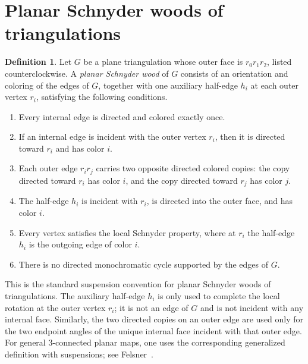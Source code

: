 \documentclass[11pt]{amsart}
\theoremstyle{plain}
\theoremstyle{definition}
\newtheorem{definition}[theorem]{Definition}
\theoremstyle{remark}
\begin{document}
\section{Planar Schnyder woods of triangulations}
\label{sec:planar}

\begin{definition}
\label{def:planar-schnyder}
Let $G$ be a plane triangulation whose outer face is $r_0 r_1 r_2$, listed counterclockwise. A \emph{planar Schnyder wood} of $G$ consists of an orientation and coloring of the edges of $G$, together with one auxiliary half-edge $h_i$ at each outer vertex $r_i$, satisfying the following conditions.
\begin{enumerate}[label=\textup{(P\arabic*)}]
  \item Every internal edge is directed and colored exactly once.
  \item If an internal edge is incident with the outer vertex $r_i$, then it is directed toward $r_i$ and has color $i$.
  \item Each outer edge $r_i r_j$ carries two opposite directed colored copies: the copy directed toward $r_i$ has color $i$, and the copy directed toward $r_j$ has color $j$.
  \item The half-edge $h_i$ is incident with $r_i$, is directed into the outer face, and has color $i$.
  \item Every vertex satisfies the local Schnyder property, where at $r_i$ the half-edge $h_i$ is the outgoing edge of color $i$.
  \item There is no directed monochromatic cycle supported by the edges of $G$.
\end{enumerate}
\end{definition}

This is the standard suspension convention for planar Schnyder woods of triangulations. The auxiliary half-edge $h_i$ is only used to complete the local rotation at the outer vertex $r_i$; it is not an edge of $G$ and is not incident with any internal face. Similarly, the two directed copies on an outer edge are used only for the two endpoint angles of the unique internal face incident with that outer edge. For general $3$-connected planar maps, one uses the corresponding generalized definition with suspensions; see Felsner~\cite{felsner2001,felsner2004}.
\end{document}
